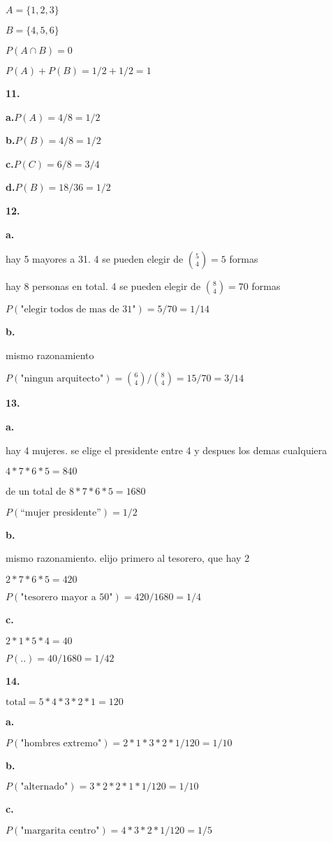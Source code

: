 \documentclass[12pt]{article}
\begin{document}
$A=\{1,2,3\}$

$B=\{4,5,6\}$

$P(A \cap B)=0$

$P(A)+P(B)=1/2+1/2=1$

\textbf{11.}

\textbf{a.}$P(A)=4/8=1/2$

\textbf{b.}$P(B)=4/8=1/2$

\textbf{c.}$P(C)=6/8=3/4$

\textbf{d.}$P(B)=18/36=1/2$

\textbf{12.}

\textbf{a.}

hay 5 mayores a 31. 4 se pueden elegir de $\binom{5}{4}=5$ formas

hay 8 personas en total. 4 se pueden elegir de $\binom{8}{4}=70$ formas

$P(\textrm{"elegir todos de mas de 31"})=5/70=1/14$

\textbf{b.}

mismo razonamiento

$P(\textrm{"ningun arquitecto"})=\binom{6}{4}/\binom{8}{4}=15/70=3/14$

\textbf{13.}

\textbf{a.}

hay 4 mujeres. se elige el presidente entre 4 y despues los demas cualquiera

$4*7*6*5=840$

de un total de $8*7*6*5=1680$

$P(\textrm{``mujer presidente''})=1/2$

\textbf{b.}

mismo razonamiento. elijo primero al tesorero, que hay 2

$2*7*6*5=420$

$P(\textrm{"tesorero mayor a 50"})=420/1680=1/4$

\textbf{c.}

$2*1*5*4=40$

$P(..)=40/1680=1/42$

\textbf{14.}

$\textrm{total}=5*4*3*2*1=120$

\textbf{a.}

$P(\textrm{"hombres extremo"})=2*1*3*2*1/120=1/10$

\textbf{b.}

$P(\textrm{"alternado"})=3*2*2*1*1/120=1/10$

\textbf{c.}

$P(\textrm{"margarita centro"})=4*3*2*1/120=1/5$
\end{document}
